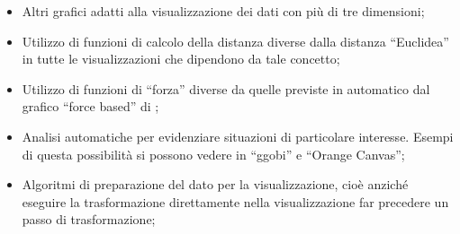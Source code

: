 \begin{itemize}
	\item Altri grafici adatti alla visualizzazione dei dati con più di tre dimensioni;
	\item Utilizzo di funzioni di calcolo della distanza diverse dalla distanza “Euclidea” in tutte le
visualizzazioni che dipendono da tale concetto;
	\item Utilizzo di funzioni di “forza” diverse da quelle previste in automatico dal grafico “force
based” di ;
	\item Analisi automatiche per evidenziare situazioni di particolare interesse. Esempi di questa
possibilità si possono vedere in “ggobi” e “Orange Canvas”;
	\item Algoritmi di preparazione del dato per la visualizzazione, cioè anziché eseguire la
trasformazione direttamente nella visualizzazione far precedere un passo di trasformazione;
\end{itemize}